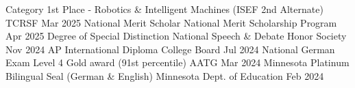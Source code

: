 


\begin{cvhonors}

\cvhonor
  {Category 1st Place - Robotics \& Intelligent Machines (ISEF 2nd Alternate)} %
  {TCRSF} %
  {} %
  {Mar 2025} %
\cvhonor
  {National Merit Scholar} %
  {National Merit Scholarship Program} %
  {} %
  {Apr 2025} %
\cvhonor
  {Degree of Special Distinction} %
  {National Speech \& Debate Honor Society} %
  {} %
  {Nov 2024} %
\cvhonor
  {AP International Diploma} %
  {College Board} %
  {} %
  {Jul 2024} %
\cvhonor
  {National German Exam Level 4 Gold award (91st percentile)} %
  {AATG} %
  {} %
  {Mar 2024} %
\cvhonor
  {Minnesota Platinum Bilingual Seal (German \& English)} %
  {Minnesota Dept. of Education} %
  {} %
  {Feb 2024} %

    
\end{cvhonors}